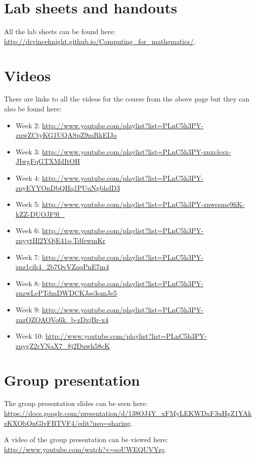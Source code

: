 \documentclass{article}
\begin{document}
\section{Lab sheets and handouts}

All the lab sheets can be found here: \url{http://drvinceknight.github.io/Computing_for_mathematics/}.

\section{Videos}

There are links to all the videos for the course from the above page but they can also be found here:

\begin{itemize}
    \item Week 2: \url{http://www.youtube.com/playlist?list=PLnC5h3PY-znwZCtyKG1UQASpZ9mRkEIJo}
    \item Week 3: \url{http://www.youtube.com/playlist?list=PLnC5h3PY-znxclcsx-JIwgFqGTXMdItOH}
    \item Week 4: \url{http://www.youtube.com/playlist?list=PLnC5h3PY-znyEYYOnDbQHq1PUuNgbhdD3}
    \item Week 5: \url{http://www.youtube.com/playlist?list=PLnC5h3PY-znwesme9fiK-kZZ-DUOJF9l_}
    \item Week 6: \url{http://www.youtube.com/playlist?list=PLnC5h3PY-znyytHl2YQjE41o-TdfewmKr}
    \item Week 7: \url{http://www.youtube.com/playlist?list=PLnC5h3PY-znz1cih4_2b7QvVZaqPnE7m4}
    \item Week 8: \url{http://www.youtube.com/playlist?list=PLnC5h3PY-znzwLePTdmDWDCKJse3omJe5}
    \item Week 9: \url{http://www.youtube.com/playlist?list=PLnC5h3PY-znzOZOAOVo6k_b-zDxjBr-x4}
    \item Week 10: \url{http://www.youtube.com/playlist?list=PLnC5h3PY-znygZ2rYNaX7_8j2Duwh58cK}
\end{itemize}

\section{Group presentation}

The group presentation slides can be seen here: \url{https://docs.google.com/presentation/d/138OJ4Y_xFMyLEKWDxF3uHgZ1YAkzKXObQnGlvFBTVF4/edit?usp=sharing}.

A video of the group presentation can be viewed here: \url{http://www.youtube.com/watch?v=soUWEQUVYzg}.
\end{document}
